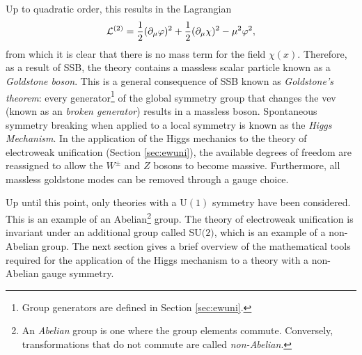 Up to quadratic order, this results in the Lagrangian
\begin{equation}
    \mathcal{L}^{(2)}=\frac{1}{2}(\partial_\mu\varphi)^2+\frac{1}{2}(\partial_\mu\chi)^2-\mu^2\varphi^2,
\end{equation}
from which it is clear that there is no mass term for the field $\chi(x)$. Therefore, as a result of SSB, the theory contains a massless scalar particle known as a \textit{Goldstone boson}. This is a general consequence of SSB known as \textit{Goldstone's theorem}: every generator\footnote{Group generators are defined in Section \ref{sec:ewuni}.} of the global symmetry group that changes the vev (known as an \textit{broken generator}) results in a massless boson. Spontaneous symmetry breaking when applied to a local symmetry is known as the \textit{Higgs Mechanism}. In the application of the Higgs mechanics to the theory of electroweak unification (Section \ref{sec:ewuni}), the available degrees of freedom are reassigned to allow the $W^{\pm}$ and $Z$ bosons to become massive. Furthermore, all massless goldstone modes can be removed through a gauge choice. %

Up until this point, only theories with a $\text{U}(1)$ symmetry have been considered. This is an example of an Abelian\footnote{An \textit{Abelian} group is one where the group elements commute. Conversely, transformations that do not commute are called \textit{non-Abelian}.} group. The theory of electroweak unification is invariant under an additional group called $\text{SU(2)}$, which is an example of a non-Abelian group. The next section gives a brief overview of the mathematical tools required for the application of the Higgs mechanism to a theory with a non-Abelian gauge symmetry.

